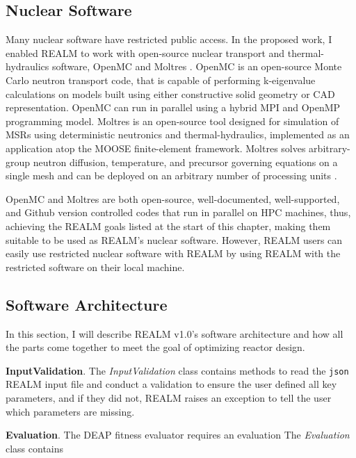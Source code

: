 \subsection{Nuclear Software}
Many nuclear software have restricted public access. 
In the proposed work, I enabled \gls{REALM} to work with open-source nuclear 
transport and thermal-hydraulics software, OpenMC \cite{romano_openmc_2013} 
and Moltres \cite{lindsay_introduction_2018}.  
OpenMC is an open-source Monte Carlo neutron transport code, that is capable of 
performing k-eigenvalue calculations on models built using either constructive 
solid geometry or CAD representation. 
OpenMC can run in parallel using a hybrid MPI and OpenMP programming model. 
Moltres is an open-source tool designed for simulation of \glspl{MSR} using 
deterministic neutronics and thermal-hydraulics, implemented as an application 
atop the \gls{MOOSE} finite-element framework.  
Moltres solves arbitrary-group neutron diffusion, temperature, and precursor 
governing equations on a single mesh and can be deployed on an arbitrary number 
of processing units \cite{lindsay_introduction_2018}.

OpenMC and Moltres are both open-source, well-documented, well-supported, and 
Github version controlled codes that run in parallel on \gls{HPC} machines, 
thus, achieving the \gls{REALM} goals listed at the start of this chapter, 
making them suitable to be used as \gls{REALM}'s nuclear software.
However, \gls{REALM} users can easily use restricted nuclear software with 
\gls{REALM} by using \gls{REALM} with the restricted software on their local 
machine. 

\subsection{Software Architecture}
In this section, I will describe \gls{REALM} v1.0's software architecture and 
how all the parts come together to meet the goal of optimizing reactor 
design. 

\vspace{0.2cm} 
\noindent
\textbf{InputValidation}. The \textit{InputValidation} class contains methods 
to read the \texttt{json} \gls{REALM} input file and conduct a validation to 
ensure the user defined all key parameters, and if they did not, \gls{REALM} 
raises an exception to tell the user which parameters are missing. 

\vspace{0.2cm} 
\noindent
\textbf{Evaluation}. The \gls{DEAP} fitness evaluator requires an evaluation 
The \textit{Evaluation} class contains 

